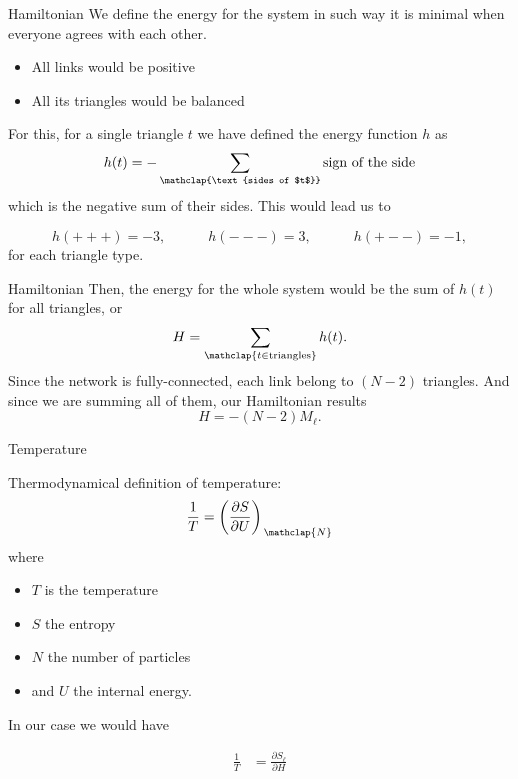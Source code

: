 
	
\begin{frame}{Hamiltonian}
	We define the energy for the system in such way it is minimal when everyone agrees with each other. 
\begin{itemize}
	\item All links would be positive
	\item All its triangles would be balanced 
\end{itemize}

For this, for a single triangle $t$ we have defined the energy function $h$ as
\begin{equation*}
    h(t) = - \sum_{\mathclap{\text{sides of $t$}}} \text{sign of the side} 
\end{equation*}
which is the negative sum of their sides. This would lead us to
\begin{center}
	
\end{center}
\vspace{-1mm}
\begin{equation*}
        h(+++) = -3,\qquad\quad
		h(---) = 3,\qquad\quad
		h(+--) = -1,
    \label{eq:h_types}
\end{equation*}
for each triangle type.\\[1em]
\end{frame}

\begin{frame}{Hamiltonian}
 Then, the energy for the whole system would be the sum of $h(t)$ for all triangles, or
 \begin{equation}
	H =	\sum_{\mathclap{t\in\text{triangles}}} h(t).
 \end{equation}
Since the network is fully-connected, each link belong to $(N-2)$ triangles. And since we are summing all of them, our Hamiltonian results 
\begin{equation}
	H = -(N-2)M_\ell.\label{eq:H_M}
\end{equation}
\end{frame}


\begin{frame}{Temperature}

Thermodynamical definition of temperature:
\begin{equation}
    \frac{1}{T} = \left( \frac{\partial S}{\partial U} \right)_{\,\mathclap{N}} \label{eq:T_def}
\end{equation}
where 
\begin{itemize}
	\item  $T$ is the temperature
	\item $S$ the entropy
	\item $N$ the number of particles
	\item and $U$ the internal energy.
\end{itemize}
In our case we would have

\begin{align}
    \frac{1}{T} &=  \frac{\partial S_\ell}{\partial H}  
\end{align}
\end{frame}

